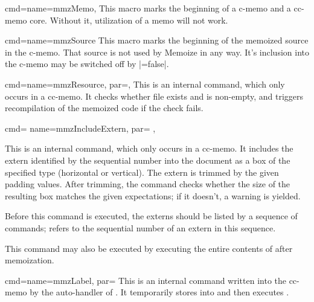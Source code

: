 \documentclass[a4paper,11pt]{article}
\begin{document}
\begin{doc}{
    cmd={name=mmzMemo},
  }
  This macro marks the beginning of a c-memo and a cc-memo core.  Without it,
  utilization of a memo will not work.
\end{doc}

\begin{doc}{cmd={name=mmzSource}}
  This macro marks the beginning of the memoized source in the c-memo.  That
  source is not used by Memoize in any way.  It's inclusion into the c-memo may
  be switched off by |=false|.
\end{doc}

\begin{doc}{
    cmd={name=mmzResource, par=},
  }
  This is an internal command, which only occurs in a cc-memo.  It checks
  whether file  exists and is non-empty, and triggers
  recompilation of the memoized code if the check fails.
\end{doc}

\begin{doc}{
    cmd={
      name=mmzIncludeExtern,
      par=%
      ,
    }
  }
  
  This is an internal command, which only occurs in a cc-memo.  It includes the
  extern identified by the sequential number  into the document as a
  box of the specified type (horizontal or vertical).  The extern is trimmed by
  the given padding values.  After trimming, the command checks whether the
  size of the resulting box matches the given expectations; if it doesn't, a
  warning is yielded.

  Before this command is executed, the externs should be listed by a sequence
  of  commands;  refers to the sequential number
  of an extern in this sequence.
  
  This command may also be executed by executing the entire contents of
   after memoization.
\end{doc}

\begin{doc}{
    cmd={name=mmzLabel, par=}
  }
  This is an internal command written into the cc-memo by the auto-handler of
  .  It temporarily stores  into
   and then executes .
\end{doc}
\end{document}
